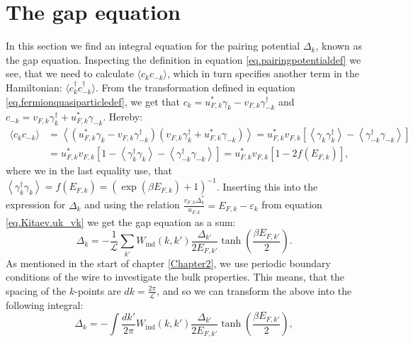\section{The gap equation} \label{sec.pairingpotential.integralequation}
In this section we find an integral equation for the pairing potential $\Delta_k$, known as the gap equation. Inspecting the definition in equation \eqref{eq.pairingpotentialdef} we see, that we need to calculate $\langle c_k c_{-k} \rangle$, which in turn specifies another term in the Hamiltonian: $\langle c^\dagger_k c^\dagger_{-k} \rangle$. From the transformation defined in equation \eqref{eq.fermionquasiparticledef}, we get that $c_k = u^*_{F,k}\gamma_k - v_{F,k}\gamma^\dagger_{-k}$ and $c_{-k} = v_{F,k}\gamma^\dagger_k + u^*_{F,k}\gamma_{-k}$. Hereby:
\begin{align}
\langle c_k c_{-k} \rangle &= \left \langle (u^*_{F,k}\gamma_k - v_{F,k}\gamma^\dagger_{-k}) (v_{F,k}\gamma^\dagger_k + u^*_{F,k}\gamma_{-k}) \right \rangle = u^*_{F,k}v_{F,k}\left[ \left \langle \gamma_k \gamma^\dagger_{k} \right \rangle - \left \langle \gamma^\dagger_{-k} \gamma_{-k} \right \rangle \right]  \nonumber \\
& =  u^*_{F,k}v_{F,k}\left[ 1 - \left \langle \gamma^\dagger_{k} \gamma_k \right \rangle - \left \langle \gamma^\dagger_{-k} \gamma_{-k} \right \rangle \right] = u^*_{F,k}v_{F,k}\left[1 - 2f(E_{F,k})\right], \nonumber
\end{align}
where we in the last equality use, that $\left \langle \gamma^\dagger_{k} \gamma_{k} \right \rangle = f(E_{F,k})=(\exp(\beta E_{F,k})+1)^{-1} $. Inserting this into the expression for $\Delta_k$ and using the relation $\frac{v_{F,k}\Delta^*_k}{u_{F,k}}=E_{F,k}-\varepsilon_k$ from equation \eqref{eq.Kitaev.uk_vk} we get the gap equation as a sum:
\begin{equation}
\Delta_k = - \frac{1}{\mathcal{L}}\sum_{k'} W_{\text{ind}}(k,k')\frac{\Delta_{k'}}{2E_{F,k'}}\tanh\left(\frac{\beta E_{F,k'}}{2}\right).
\label{eq.GapequationSum}
\end{equation} 
As mentioned in the start of chapter \ref{Chapter2}, we use periodic boundary conditions of the wire to investigate the bulk properties. This means, that the spacing of the $k$-points are $dk = \frac{2\pi}{\mathcal{L}}$, and so we can transform the above into the following integral:
\begin{equation}
\Delta_k = - \int \frac{dk'}{2\pi} W_{\text{ind}}(k,k')\frac{\Delta_{k'}}{2E_{F,k'}}\tanh\left(\frac{\beta E_{F,k'}}{2}\right), 
\label{eq.GapequationIntegral}
\end{equation} 
